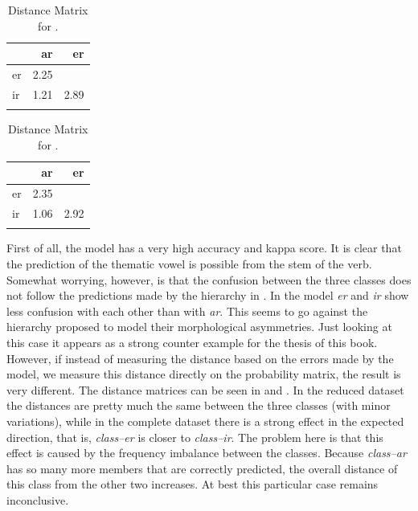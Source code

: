 \begin{table}
    
    \centering
    \begin{tabular}{lrr}
      \lsptoprule
      & ar   & er   \\
      \midrule
      er & 2.25 &      \\
      ir & 1.21 & 2.89 \\
      \lspbottomrule
    \end{tabular}
    \caption{Distance Matrix for . \hfill}
    \label{tab:spanish-verbs-theme-dist}

\end{table}

\begin{table}
    
    \centering
    \begin{tabular}{lrr}
      \lsptoprule
      & ar       & er       \\
      \midrule
      er & 2.35&\\
      ir & 1.06& 2.92\\
      \lspbottomrule
    \end{tabular}\caption{Distance Matrix for .}
    \label{tab:spanish-verbs-theme-dist-2}
\end{table}
 

First of all, the model has a very high accuracy and kappa score. It is clear that the prediction of the thematic vowel is possible from the stem of the verb. Somewhat worrying, however, is that the confusion between the three classes does not follow the predictions made by the hierarchy in . In the model \textit{er} and \textit{ir} show less confusion with each other than with \textit{ar}. This seems to go against the hierarchy proposed to model their morphological asymmetries. Just looking at this case it appears as a strong counter example for the thesis of this book. 
However, if instead of measuring the distance based on the errors made by the model, we measure this distance directly on the probability matrix, the result is very different. The distance matrices can be seen in  and . In the reduced dataset the distances are pretty much the same between the three classes (with minor variations), while in the complete dataset there is a strong effect in the expected direction, that is, \textit{class--er} is closer to \textit{class--ir}. The problem here is that this effect is caused by the frequency imbalance between the classes. Because \textit{class--ar} has so many more members that are correctly predicted, the overall distance of this class from the other two increases. At best this particular case remains inconclusive.
 
